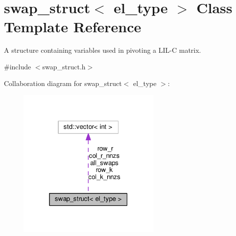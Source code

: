 \hypertarget{classswap__struct}{}\section{swap\+\_\+struct$<$ el\+\_\+type $>$ Class Template Reference}
\label{classswap__struct}


A structure containing variables used in pivoting a L\+I\+L-\/C matrix.  




{\ttfamily \#include $<$swap\+\_\+struct.\+h$>$}



Collaboration diagram for swap\+\_\+struct$<$ el\+\_\+type $>$\+:\nopagebreak
\begin{figure}[H]
\begin{center}
\leavevmode
\includegraphics[width=199pt]{classswap__struct__coll__graph}
\end{center}
\end{figure}

